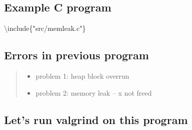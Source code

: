 \documentclass[
]{article}
\newenvironment{Shaded}{}{}
\newcommand{\NormalTok}[1]{#1}
\newcommand{\StringTok}[1]{\textcolor[rgb]{0.25,0.44,0.63}{#1}}
\providecommand{\tightlist}{%
  \setlength{\itemsep}{0pt}\setlength{\parskip}{0pt}}
\begin{document}
\hypertarget{example-c-program}{%
\subsection{Example C program}\label{example-c-program}}

\begin{Shaded}
\begin{Highlighting}[numbers=left,,]
\NormalTok{\textbackslash{}include\{}\StringTok{"src/memleak.c"}\NormalTok{\}}
\end{Highlighting}
\end{Shaded}

\hypertarget{errors-in-previous-program}{%
\subsection{Errors in previous
program}\label{errors-in-previous-program}}

\begin{quote}
\begin{itemize}
\tightlist
\item
  problem 1: heap block overrun
\item
  problem 2: memory leak -- x not freed
\end{itemize}
\end{quote}

\hypertarget{lets-run-valgrind-on-this-program}{%
\subsection{Let's run valgrind on this
program}\label{lets-run-valgrind-on-this-program}}
\end{document}
